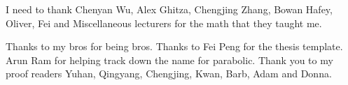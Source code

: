 I need to thank Chenyan Wu,  Alex Ghitza,  Chengjing Zhang, Bowan Hafey, Oliver, Fei and Miscellaneous lecturers
for the math that they taught me. 

Thanks to my bros for being bros. Thanks to Fei Peng for the thesis template. Arun Ram for helping track down the name for parabolic. Thank you to my proof readers Yuhan, Qingyang, Chengjing, Kwan, Barb, Adam and Donna.
